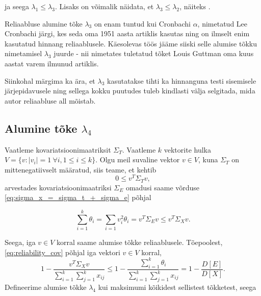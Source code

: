 \documentclass[a4paper,12pt,oneside]{article}
\numberwithin{equation}{section}
\theoremstyle{definition}
\begin{document}
ja seega $\lambda_1 \leq \lambda_3$. Lisaks on võimalik näidata, et $\lambda_3 \leq \lambda_2$, näiteks \cite[148-149]{Revelle2008}.


Reliaabluse alumine tõke $\lambda_3$ on enam tuntud kui Cronbachi $\alpha$, nimetatud Lee Cronbachi järgi, kes seda oma 1951 aasta artiklis\cite{Cronbach1951} kasutas ning on ilmselt enim kasutatud hinnang reliaablusele. Käesolevas töös jääme siiski selle alumise tõkku nimetamisel $\lambda_3$ juurde - nii nimetates tuletatud tõket Louis Guttman oma kuus aastat varem ilmunud artiklis\cite{Guttman1945}.

Siinkohal märgima ka ära, et $\lambda_3$ kasutatakse tihti ka hinnanguna testi sisemisele järjepidavusele ning sellega kokku puutudes tuleb kindlasti välja selgitada, mida autor reliaabluse all mõistab.


 

 
\subsection{Alumine tõke $\lambda_4$}

Vaatleme kovariatsioonimaatriksit $\Sigma_T$. Vaatleme $k$ vektorite hulka $V = \lbrace v : \lvert {v_i} \rvert = 1 ~ \forall i, 1 \leq i \leq k \rbrace$.  Olgu meil suvaline vektor $v \in V$, kuna $\Sigma_T$ on mittenegatiivselt määratud, siis teame, et kehtib
\begin{equation*}
0 \leq v^{T} \Sigma_T v,
\end{equation*}
 arvestades kovariatsioonimaatriksi $\Sigma_E$ omadusi saame võrduse \eqref{eq:sigma_x_=_sigma_t_+_sigma_e} põhjal 

\begin{equation*}
\sum \limits_{i=1}^k \theta_i = \sum \limits_{i=1} v_{i}^{2} \theta_i = v^{T} \Sigma_E v \leq v^{T} \Sigma_X v \text{.}
\end{equation*}

Seega, iga $v \in V$ korral saame alumise tõkke reliaablusele. Tõepoolest, \eqref{eq:reliability_cov} põhjal iga vektori $v \in V$ korral,  
\begin{equation*}
1 - \frac{v^T \Sigma_X v}{\sum \limits_{i=1}^k \sum \limits_{j=1}^k x_{ij}} \leq 1 - \frac{\sum \limits_{i=1}^k \theta_i}{\sum \limits_{i=1}^k \sum \limits_{j=1}^k x_{ij}} = 1 - \frac{D \left[ E \right]}{ D \left[X \right]  } \text{.}
\end{equation*} 
Defineerime alumise tõkke $\lambda_4$ kui maksimumi kõikidest sellistest tõkketest, seega
\end{document}
